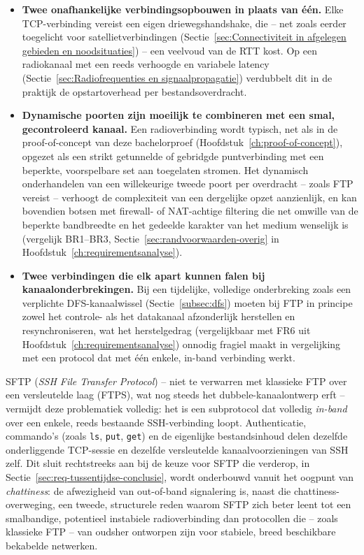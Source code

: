 \begin{itemize}
  \item \textbf{Twee onafhankelijke verbindingsopbouwen in plaats van \'e\'en.} Elke
        TCP-verbinding vereist een eigen driewegshandshake, die -- net zoals eerder
        toegelicht voor satellietverbindingen (Sectie~\ref{sec:Connectiviteit in afgelegen gebieden en noodsituaties})
        -- een veelvoud van de RTT kost. Op een radiokanaal met een reeds verhoogde en
        variabele latency (Sectie~\ref{sec:Radiofrequenties en signaalpropagatie})
        verdubbelt dit in de praktijk de opstartoverhead per bestandsoverdracht.
  \item \textbf{Dynamische poorten zijn moeilijk te combineren met een smal, gecontroleerd
        kanaal.} Een radioverbinding wordt typisch, net als in de proof-of-concept van
        deze bachelorproef (Hoofdstuk~\ref{ch:proof-of-concept}), opgezet als een
        strikt getunnelde of gebridgde puntverbinding met een beperkte, voorspelbare
        set aan toegelaten stromen. Het dynamisch onderhandelen van een willekeurige
        tweede poort per overdracht -- zoals FTP vereist -- verhoogt de complexiteit van
        een dergelijke opzet aanzienlijk, en kan bovendien botsen met firewall- of
        NAT-achtige filtering die net omwille van de beperkte bandbreedte en het gedeelde
        karakter van het medium wenselijk is (vergelijk BR1--BR3,
        Sectie~\ref{sec:randvoorwaarden-overig} in Hoofdstuk~\ref{ch:requirementsanalyse}).
  \item \textbf{Twee verbindingen die elk apart kunnen falen bij kanaalonderbrekingen.}
        Bij een tijdelijke, volledige onderbreking zoals een verplichte DFS-kanaalwissel
        (Sectie~\ref{subsec:dfs}) moeten bij FTP in principe zowel het controle- als het
        datakanaal afzonderlijk herstellen en resynchroniseren, wat het
        herstelgedrag (vergelijkbaar met FR6 uit
        Hoofdstuk~\ref{ch:requirementsanalyse}) onnodig fragiel maakt in vergelijking met
        een protocol dat met \'e\'en enkele, in-band verbinding werkt.
\end{itemize}

SFTP (\textit{SSH File Transfer Protocol}) -- niet te verwarren met klassieke FTP over
een versleutelde laag (FTPS), wat nog steeds het dubbele-kanaalontwerp erft -- vermijdt
deze problematiek volledig: het is een subprotocol dat volledig \emph{in-band} over een
enkele, reeds bestaande SSH-verbinding loopt. Authenticatie, commando's (zoals
\texttt{ls}, \texttt{put}, \texttt{get}) en de eigenlijke bestandsinhoud delen dezelfde
onderliggende TCP-sessie en dezelfde versleutelde kanaalvoorzieningen van SSH zelf. Dit
sluit rechtstreeks aan bij de keuze voor SFTP die verderop, in
Sectie~\ref{sec:req-tussentijdse-conclusie}, wordt onderbouwd vanuit het oogpunt van
\textit{chattiness}: de afwezigheid van out-of-band signalering is, naast die
chattiness-overweging, een tweede, structurele reden waarom SFTP zich beter leent tot een
smalbandige, potentieel instabiele radioverbinding dan protocollen die -- zoals klassieke
FTP -- van oudsher ontworpen zijn voor stabiele, breed beschikbare bekabelde netwerken.

